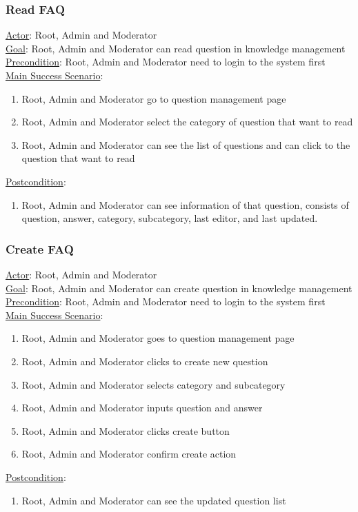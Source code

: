 \documentclass[12pt,oneside,openright,a4paper]{cpe-english-project}
\begin{document}
	\subsubsection{Read FAQ}
	\underline{Actor}: Root, Admin and Moderator\\
	\underline{Goal}: Root, Admin and Moderator can read question in knowledge management\\
	\underline{Precondition}: Root, Admin and Moderator need to login to the system first\\
	\underline{Main Success Scenario}:
	\begin{enumerate}[label={\arabic*.}]
		\item Root, Admin and Moderator go to question management page
		\item Root, Admin and Moderator select the category of question that want to read
		\item Root, Admin and Moderator can see the list of questions and can click to the question that want to read
	\end{enumerate}
	\underline{Postcondition}: 
	\begin{enumerate}[label={\arabic*.}]
		\item Root, Admin and Moderator can see information of that question, consists of question, answer, category, subcategory, last editor, and last updated.
	\end{enumerate}

	\subsubsection{Create FAQ}
	\underline{Actor}: Root, Admin and Moderator\\
	\underline{Goal}: Root, Admin and Moderator can create question in knowledge management\\
	\underline{Precondition}: Root, Admin and Moderator need to login to the system first\\
	\underline{Main Success Scenario}:
	\begin{enumerate}[label={\arabic*.}]
		\item Root, Admin and Moderator goes to question management page
		\item Root, Admin and Moderator clicks to create new question
		\item Root, Admin and Moderator selects category and subcategory
		\item Root, Admin and Moderator inputs question and answer
		\item Root, Admin and Moderator clicks create button
		\item Root, Admin and Moderator confirm create action
	\end{enumerate}
	\underline{Postcondition}: 
	\begin{enumerate}[label={\arabic*.}]
		\item Root, Admin and Moderator can see the updated question list
	\end{enumerate}
\end{document}
